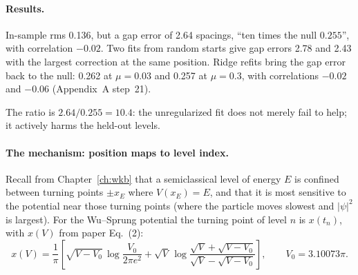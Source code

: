 \paragraph{Results.} In-sample rms 0.136, but a gap error of 2.64 spacings, ``ten times the null $0.255$'', with correlation $-0.02$. Two fits from random starts give gap errors 2.78 and 2.43 with the largest correction at the same position. Ridge refits bring the gap error back to the null: 0.262 at $\mu=0.03$ and 0.257 at $\mu=0.3$, with correlations $-0.02$ and $-0.06$ (Appendix~A step~21).

The ratio is $2.64/0.255=10.4$: the unregularized fit does not merely fail to help; it actively harms the held-out levels.

\paragraph{The mechanism: position maps to level index.} Recall from Chapter~\ref{ch:wkb} that a semiclassical level of energy $E$ is confined between turning points $\pm x_E$ where $V(x_E)=E$, and that it is most sensitive to the potential near those turning points (where the particle moves slowest and $|\psi|^2$ is largest). For the Wu--Sprung potential the turning point of level $n$ is $x(t_n)$, with $x(V)$ from paper Eq.~(2):
\begin{equation}
x(V)=\frac1\pi\left[\sqrt{V-V_0}\,\log\frac{V_0}{2\pi e^2}+\sqrt V\,\log\frac{\sqrt V+\sqrt{V-V_0}}{\sqrt V-\sqrt{V-V_0}}\right],\qquad V_0=3.10073\pi .
\label{eq:paper-memorization-ws}
\end{equation}

